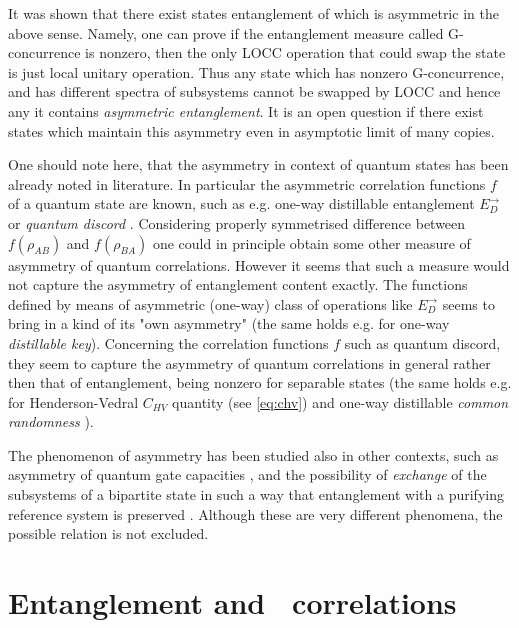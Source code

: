 \documentclass[rmp,12pt,preprint]{revtex4-2}
\begin{document}
It was shown that there exist states entanglement of which is asymmetric
in the above sense. Namely, one can prove if the entanglement measure called G-concurrence
\cite{SinoleckaZK2001-manifold,FanMI2002-concurrence,Gour-mon2004} is nonzero,
then the only LOCC operation that could swap the state is just local
unitary operation. Thus any state which has nonzero G-concurrence, and
has different spectra of subsystems cannot be swapped by LOCC and
hence any it contains {\it asymmetric entanglement}. It is an
open question if there exist states which maintain this asymmetry even
in asymptotic limit of many copies.

One should note here, that the asymmetry in context of quantum states
has been already noted in literature. In particular the asymmetric
correlation functions $f$ of a quantum state are known, such as
e.g. one-way distillable entanglement $E_D^{\rightarrow}$
\cite{BBPSSW96} or {\it quantum discord}
\cite{Zurek-discord}. Considering properly symmetrised difference
between $f(\rho_{AB})$ and $f(\rho_{BA})$ one could in principle
obtain some other measure of asymmetry of quantum
correlations. However it seems that such a measure would not capture
the asymmetry of entanglement content exactly. The functions defined
by means of asymmetric (one-way) class of operations like
$E_D^{\rightarrow}$ seems to bring in a kind of its "own asymmetry"
(the same holds e.g. for one-way {\it distillable key}). Concerning
the correlation functions $f$ such as quantum discord, they seem to
capture the asymmetry of quantum correlations in general rather then
that of entanglement, being nonzero for separable states (the same
holds e.g. for Henderson-Vedral $C_{HV}$ quantity (see \ref{eq:chv})
and one-way distillable {\it common randomness}
\cite{DevetakW03-common}).

The phenomenon of asymmetry has been studied also in other contexts,
such as asymmetry of quantum gate capacities
\cite{HarrowShor2005,LindenSW2005-entpower}, and the possibility of
{\it exchange} of the subsystems of a bipartite state in such a way
that entanglement with a purifying reference system is preserved
\cite{uncom_info}. Although these are very different phenomena, the
possible relation is not excluded.




\section{Entanglement and \secure\ correlations}
\label{sec:Ent_in_QKD}
\end{document}
